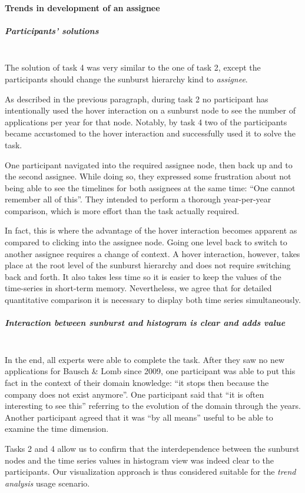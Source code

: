 \paragraph{Trends in development of an assignee}
\subparagraph{Participants' solutions}~\\
The solution of task 4 was very similar to the one of task 2, except the participants should change the sunburst hierarchy kind to \textit{assignee}.

As described in the previous paragraph, during task 2 no participant has intentionally used the hover interaction on a sunburst node to see the number of applications per year for that node.
Notably, by task 4 two of the participants became accustomed to the hover interaction and successfully used it to solve the task.

One participant navigated into the required assignee node, then back up and to the second assignee.
While doing so, they expressed some frustration about not being able to see the timelines for both assignees at the same time: ``One cannot remember all of this''.
They intended to perform a thorough year-per-year comparison, which is more effort than the task actually required.

In fact, this is where the advantage of the hover interaction becomes apparent as compared to clicking into the assignee node.
Going one level back to switch to another assignee requires a change of context.
A hover interaction, however, takes place at the root level of the sunburst hierarchy and does not require switching back and forth.
It also takes less time so it is easier to keep the values of the time-series in short-term memory.
Nevertheless, we agree that for detailed quantitative comparison it is necessary to display both time series simultaneously.

\subparagraph{Interaction between sunburst and histogram is clear and adds value}~\\
In the end, all experts were able to complete the task.
After they saw no new applications for Bausch \& Lomb since 2009, one participant was able to put this fact in the context of their domain knowledge: ``it stops then because the company does not exist anymore''.
One participant said that ``it is often interesting to see this'' referring to the evolution of the domain through the years.
Another participant agreed that it was ``by all means'' useful to be able to examine the time dimension.

Tasks 2 and 4 allow us to confirm that the interdependence between the sunburst nodes and the time series values in histogram view was indeed clear to the participants.
Our visualization approach is thus considered suitable for the \textit{trend analysis} usage scenario.

